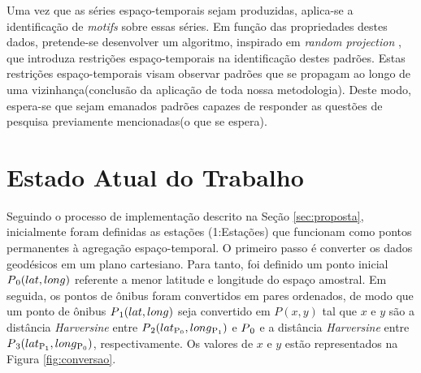 \documentclass[12pt]{report} %
\begin{document}
Uma vez que as séries espaço-temporais sejam produzidas, aplica-se a identificação de \emph{motifs} sobre essas séries. Em função das propriedades destes dados, pretende-se desenvolver um algoritmo, inspirado em \emph{random projection} \citep{li2009probabilistic}, que introduza restrições espaço-temporais na identificação destes padrões. Estas restrições espaço-temporais visam observar padrões que se propagam ao longo de uma vizinhança(conclusão da aplicação de toda nossa metodologia). Deste modo, espera-se que sejam emanados padrões capazes de responder as questões de pesquisa previamente mencionadas(o que se espera).  

\chapter{Estado Atual do Trabalho}
\label{sec:estado_atual}

Seguindo o processo de implementação descrito na Seção \ref{sec:proposta}, inicialmente foram definidas as estações (1:Estações) que funcionam como pontos permanentes à agregação espaço-temporal. O primeiro passo é converter os dados geodésicos em um plano cartesiano. Para tanto, foi definido um ponto inicial $P\textsubscript{0}(lat, long)$ referente a menor latitude e longitude do espaço amostral. Em seguida, os pontos de ônibus foram convertidos em pares ordenados, de modo que um ponto de ônibus $P\textsubscript{1}(lat,long)$ seja convertido em $P(x,y)$ tal que $x$ e $y$ são a distância \emph{Harversine} entre $P\textsubscript{2}(lat\textsubscript{P\textsubscript{0}},long\textsubscript{P\textsubscript{1}})$ e $P\textsubscript{0}$ e a distância \emph{Harversine} entre $P\textsubscript{3}(lat\textsubscript{P\textsubscript{1}},long\textsubscript{P\textsubscript{0}})$, respectivamente. Os valores de $x$ e $y$ estão representados na Figura \ref{fig:conversao}.
\end{document}
